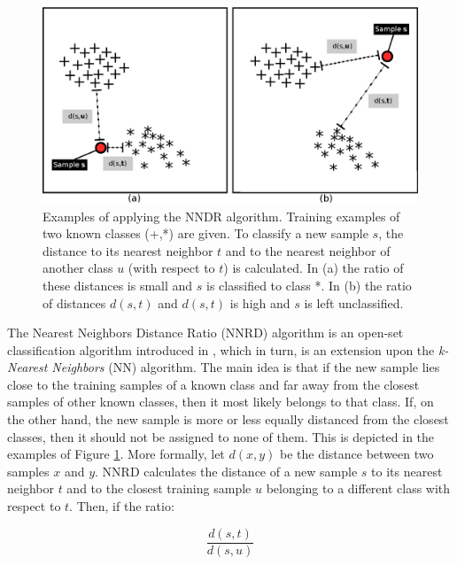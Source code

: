 \begin{figure}[t]
	\begin{center}
    	\includegraphics[scale=0.70]{Figures/NNDR_diagrams.eps}
		\caption{Examples of applying the NNDR algorithm. Training examples of two known classes (+,*) are given. To classify a new sample $s$, the distance to its nearest neighbor $t$ and to the nearest neighbor of another class $u$ (with respect to $t$) is calculated. In (a) the ratio of these distances is small and $s$ is classified to class *.  In (b) the ratio of distances $d(s,t)$ and $d(s,t)$ is high and $s$ is left unclassified.}
		\label{chap:openset:fig:NNDR_single_decision}
	\end{center}
\end{figure}

The Nearest Neighbors Distance Ratio (NNRD) algorithm is an open-set classification algorithm introduced in , which in turn, is an extension upon the \textit{k-Nearest Neighbors} (NN) algorithm. The main idea is that if the new sample lies close to the training samples of a known class and far away from the closest samples of other known classes, then it most likely belongs to that class. If, on the other hand, the new sample is more or less equally distanced from the closest classes, then it should not be assigned to none of them. This is depicted in the examples of Figure \ref{chap:openset:fig:NNDR_single_decision}. More formally, let $d(x,y)$ be the distance between two samples $x$ and $y$. NNRD calculates the distance of a new sample $s$ to its nearest neighbor $t$ and to the closest training sample $u$ belonging to a different class with respect to $t$. Then, if the ratio: 

\begin{equation}
    \frac{d(s,t)}{d(s,u)}
\end{equation}

